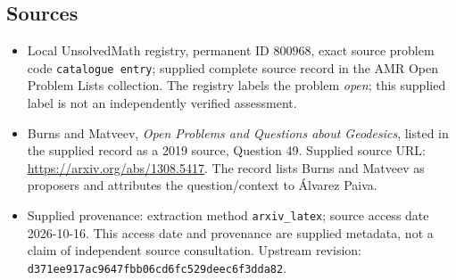 \documentclass[11pt]{article}
\begin{document}
\subsection{Sources}
\begin{itemize}
\item Local UnsolvedMath registry, permanent ID \(800968\), exact source problem code \texttt{catalogue entry}; supplied complete source record in the AMR Open Problem Lists collection. The registry labels the problem \emph{open}; this supplied label is not an independently verified assessment.
\item Burns and Matveev, \emph{Open Problems and Questions about Geodesics}, listed in the supplied record as a 2019 source, Question 49. Supplied source URL: \url{https://arxiv.org/abs/1308.5417}. The record lists Burns and Matveev as proposers and attributes the question/context to \'Alvarez Paiva.
\item Supplied provenance: extraction method \texttt{arxiv\_latex}; source access date 2026-10-16. This access date and provenance are supplied metadata, not a claim of independent source consultation. Upstream revision: \texttt{d371ee917ac9647fbb06cd6fc529deec6f3dda82}.
\end{itemize}
\end{document}
